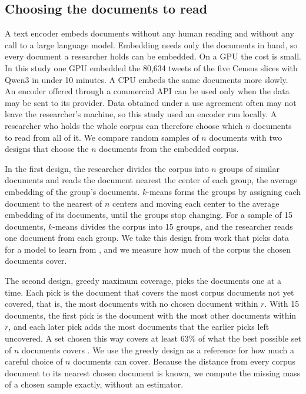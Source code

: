 \subsection{Choosing the documents to read}
\label{sec:design}

A text encoder embeds documents without any human reading and without any call to a large language model. Embedding needs only the documents in hand, so every document a researcher holds can be embedded. On a GPU the cost is small. In this study one GPU embedded the 80{,}634 tweets of the five Census slices with Qwen3 in under 10 minutes. A CPU embeds the same documents more slowly. An encoder offered through a commercial API can be used only when the data may be sent to its provider. Data obtained under a use agreement often may not leave the researcher's machine, so this study used an encoder run locally. A researcher who holds the whole corpus can therefore choose which $n$ documents to read from all of it. We compare random samples of $n$ documents with two designs that choose the $n$ documents from the embedded corpus.

In the first design, the researcher divides the corpus into $n$ groups of similar documents and reads the document nearest the center of each group, the average embedding of the group's documents. $k$-means \citep{lloyd1982} forms the groups by assigning each document to the nearest of $n$ centers and moving each center to the average embedding of its documents, until the groups stop changing. For a sample of 15 documents, $k$-means divides the corpus into 15 groups, and the researcher reads one document from each group. We take this design from work that picks data for a model to learn from \citep{chang2021training,yuan2020coldstart,hacohen2022active,zhang2023autocot}, and we measure how much of the corpus the chosen documents cover.

The second design, greedy maximum coverage, picks the documents one at a time. Each pick is the document that covers the most corpus documents not yet covered, that is, the most documents with no chosen document within $r$. With 15 documents, the first pick is the document with the most other documents within $r$, and each later pick adds the most documents that the earlier picks left uncovered. A set chosen this way covers at least 63\% of what the best possible set of $n$ documents covers \citep{nemhauser1978}. We use the greedy design as a reference for how much a careful choice of $n$ documents can cover. Because the distance from every corpus document to its nearest chosen document is known, we compute the missing mass of a chosen sample exactly, without an estimator.

